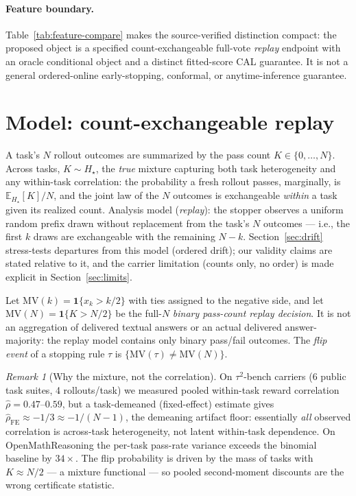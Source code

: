 \documentclass{article}
\theoremstyle{definition}
\theoremstyle{remark}
\newtheorem{remark}{Remark}
\newcommand{\trueH}{H_\star}
\newcommand{\MV}{\mathrm{MV}}
\newcommand{\E}{\mathbb{E}}
\begin{document}
\paragraph{Feature boundary.} Table~\ref{tab:feature-compare} makes the
source-verified distinction compact: the proposed object is a specified
count-exchangeable full-vote \emph{replay} endpoint with an oracle conditional
object and a distinct fitted-score CAL guarantee. It is not a general
ordered-online early-stopping, conformal, or anytime-inference guarantee.

\section{Model: count-exchangeable replay}
\label{sec:model}

A task's $N$ rollout outcomes are summarized by the pass count
$K\in\{0,\dots,N\}$. Across tasks, $K\sim\trueH$, the \emph{true} mixture
capturing both
task heterogeneity and any within-task correlation: the probability a fresh
rollout passes, marginally, is $\E_{\trueH}[K]/N$, and the joint law of the $N$
outcomes is exchangeable \emph{within} a task given its realized count.
Analysis model (\emph{replay}): the stopper observes a uniform random
prefix drawn without replacement from the task's $N$ outcomes --- i.e., the
first $k$ draws are exchangeable with the remaining $N-k$.
Section~\ref{sec:drift} stress-tests departures from this model (ordered
drift); our validity claims are stated relative to it, and the carrier
limitation (counts only, no order) is made explicit in
Section~\ref{sec:limits}.

Let $\MV(k)=\mathbf{1}\{x_k>k/2\}$ with ties assigned to the negative side,
and let $\MV(N)=\mathbf{1}\{K>N/2\}$ be the full-$N$ \emph{binary
pass-count replay decision}.  It is not an aggregation of delivered textual
answers or an actual delivered answer-majority: the replay model contains only
binary pass/fail outcomes. The \emph{flip event} of a stopping rule $\tau$ is
$\{\MV(\tau)\neq\MV(N)\}$.

\begin{remark}[Why the mixture, not the correlation]
\label{rem:pooled}
On $\tau^2$-bench carriers (6 public task suites, 4 rollouts/task) we measured
pooled within-task reward correlation $\hat\rho=0.47$--$0.59$, but a
task-demeaned (fixed-effect) estimate gives $\hat\rho_{\mathrm{FE}}\approx-1/3
\approx-1/(N-1)$, the demeaning artifact floor: essentially \emph{all}
observed correlation is across-task heterogeneity, not latent within-task
dependence. On OpenMathReasoning the per-task pass-rate variance exceeds the
binomial baseline by $34\times$. The flip probability is driven by the mass of
tasks with $K\approx N/2$ --- a mixture functional --- so pooled
second-moment discounts are the wrong certificate statistic.
\end{remark}
\end{document}
